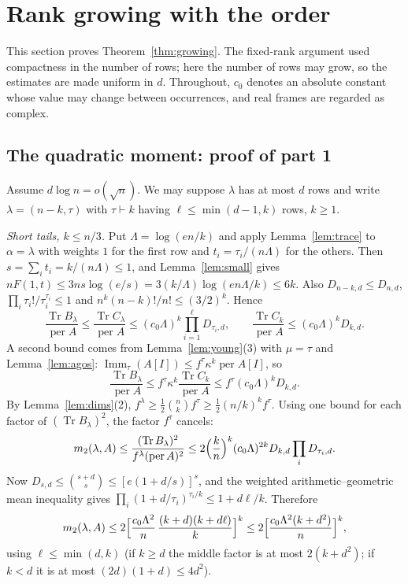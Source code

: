 \documentclass[11pt,a4paper]{article}
\theoremstyle{remark}
\newcommand{\per}{\operatorname{per}}
\newcommand{\Tr}{\operatorname{Tr}}
\newcommand{\Imm}{\operatorname{Imm}}
\begin{document}
\section{Rank growing with the order}\label{sec:growing}
This section proves Theorem~\ref{thm:growing}. The fixed-rank argument used compactness in the number of rows; here the number of rows may grow, so the estimates are made uniform in $d$. Throughout, $c_0$ denotes an absolute constant whose value may change between occurrences, and real frames are regarded as complex.

\subsection{The quadratic moment: proof of part 1}
Assume $d\log n=o(\sqrt n)$. We may suppose $\lambda$ has at most $d$ rows and write $\lambda=(n-k,\tau)$ with $\tau\vdash k$ having $\ell\le\min(d-1,k)$ rows, $k\ge1$.

\emph{Short tails, $k\le n/3$.} Put $\Lambda=\log(en/k)$ and apply Lemma~\ref{lem:trace} to $\alpha=\lambda$ with weights $1$ for the first row and $t_i=\tau_i/(n\Lambda)$ for the others. Then $s=\sum_it_i=k/(n\Lambda)\le1$, and Lemma~\ref{lem:small} gives $nF(1,t)\le3ns\log(e/s)=3(k/\Lambda)\log(en\Lambda/k)\le6k$. Also $D_{n-k,d}\le D_{n,d}$, $\prod_i\tau_i!/\tau_i^{\tau_i}\le1$ and $n^k(n-k)!/n!\le(3/2)^k$. Hence
\begin{equation}\label{eq:short1}
 \frac{\Tr B_\lambda}{\per A}\le\frac{\Tr C_\lambda}{\per A}\le(c_0\Lambda)^k\prod_{i=1}^\ell D_{\tau_i,d},
 \qquad
 \frac{\Tr C_k}{\per A}\le(c_0\Lambda)^kD_{k,d}.
\end{equation}
A second bound comes from Lemma~\ref{lem:young}(3) with $\mu=\tau$ and Lemma~\ref{lem:agos}: $\Imm_\tau(A[I])\le f^\tau\kappa^k\per A[I]$, so
\[
 \frac{\Tr B_\lambda}{\per A}\le f^\tau\kappa^k\frac{\Tr C_k}{\per A}\le f^\tau(c_0\Lambda)^kD_{k,d}.
\]
By Lemma~\ref{lem:dims}(2), $f^\lambda\ge\frac12\binom nkf^\tau\ge\frac12(n/k)^kf^\tau$. Using one bound for each factor of $(\Tr B_\lambda)^2$, the factor $f^\tau$ cancels:
\[
 m_2(\lambda,A)\le\frac{(\Tr B_\lambda)^2}{f^\lambda(\per A)^2}\le2\Bigl(\frac kn\Bigr)^k(c_0\Lambda)^{2k}D_{k,d}\prod_iD_{\tau_i,d}.
\]
Now $D_{s,d}\le\binom{s+d}{s}\le[e(1+d/s)]^s$, and the weighted arithmetic--geometric mean inequality gives $\prod_i(1+d/\tau_i)^{\tau_i/k}\le1+d\ell/k$. Therefore
\begin{equation}\label{eq:short2}
 m_2(\lambda,A)\le2\Bigl[\frac{c_0\Lambda^2}{n}\,\frac{(k+d)(k+d\ell)}{k}\Bigr]^k\le2\Bigl[\frac{c_0\Lambda^2(k+d^2)}{n}\Bigr]^k,
\end{equation}
using $\ell\le\min(d,k)$ (if $k\ge d$ the middle factor is at most $2(k+d^2)$; if $k<d$ it is at most $(2d)(1+d)\le4d^2$).
\end{document}
